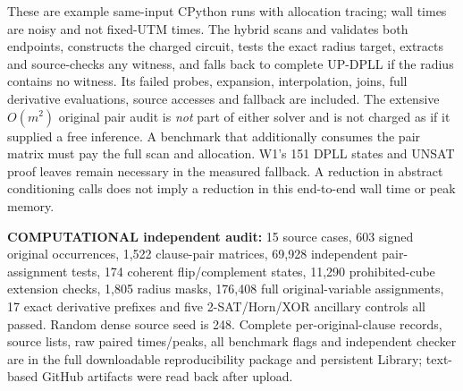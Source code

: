 \documentclass[11pt]{article}
\begin{document}
\begin{center}\small
{}
\end{center}
These are example same-input CPython runs with allocation tracing; wall times are noisy and not fixed-UTM times. The hybrid scans and validates both endpoints, constructs the charged circuit, tests the exact radius target, extracts and source-checks any witness, and falls back to complete UP-DPLL if the radius contains no witness. Its failed probes, expansion, interpolation, joins, full derivative evaluations, source accesses and fallback are included. The extensive $O(m^2)$ original pair audit is \emph{not} part of either solver and is not charged as if it supplied a free inference. A benchmark that additionally consumes the pair matrix must pay the full scan and allocation. W1's 151 DPLL states and UNSAT proof leaves remain necessary in the measured fallback. A reduction in abstract conditioning calls does not imply a reduction in this end-to-end wall time or peak memory.

\noindent\textbf{COMPUTATIONAL independent audit:} 15 source cases, 603 signed original occurrences, 1,522 clause-pair matrices, 69,928 independent pair-assignment tests, 174 coherent flip/complement states, 11,290 prohibited-cube extension checks, 1,805 radius masks, 176,408 full original-variable assignments, 17 exact derivative prefixes and five 2-SAT/Horn/XOR ancillary controls all passed. Random dense source seed is 248. Complete per-original-clause records, source lists, raw paired times/peaks, all benchmark flags and independent checker are in the full downloadable reproducibility package and persistent Library; text-based GitHub artifacts were read back after upload.
\end{document}
